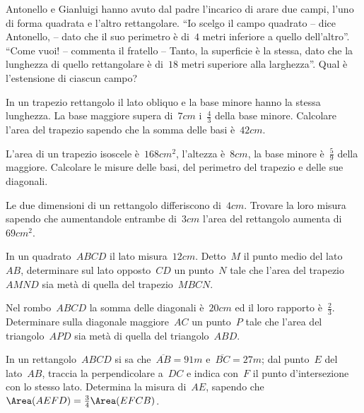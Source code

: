\begin{multicols}{2}
\begin{esercizio}[\Ast]
\label{ese:16.98}
Antonello e Gianluigi hanno avuto dal padre l'incarico di arare due campi, l'uno di forma quadrata e l'altro rettangolare. ``Io scelgo il campo quadrato -- dice Antonello, -- dato che il suo perimetro è di~$4$ metri inferiore a quello dell'altro''. ``Come vuoi! -- commenta il fratello -- Tanto, la superficie è la stessa, dato che la lunghezza di quello rettangolare è di~$18$ metri superiore alla larghezza''. Qual è l'estensione di ciascun campo?
\end{esercizio}

\begin{esercizio}[\Ast]
\label{ese:16.99}
In un trapezio rettangolo il lato obliquo e la base minore hanno la stessa lunghezza. La base maggiore supera di~$7\unit{cm}$ i~$\frac{4}{3}$ della base minore. Calcolare l'area del trapezio sapendo che la somma delle basi è~$42\unit{cm}$.
\end{esercizio}

\begin{esercizio}[\Ast]
\label{ese:16.100}
L'area di un trapezio isoscele è~$168\unit{cm^2}$, l'altezza è~$8\unit{cm}$, la base minore è~$\frac{5}{9}$ della maggiore. Calcolare le misure delle basi, del perimetro del trapezio e delle sue diagonali.
\end{esercizio}

\begin{esercizio}[\Ast]
\label{ese:16.101}
Le due dimensioni di un rettangolo differiscono di~$4\unit{cm}$. Trovare la loro misura sapendo che aumentandole entrambe di~$3\unit{cm}$ l'area del rettangolo aumenta di~$69\unit{cm^2}$.
\end{esercizio}

\begin{esercizio}[\Ast]
\label{ese:16.102}
In un quadrato~$ABCD$ il lato misura~$12\unit{cm}$. Detto~$M$ il punto medio del lato~$AB$, determinare sul lato opposto~$CD$ un punto~$N$ tale che l'area del trapezio~$AMND$ sia metà di quella del trapezio~$MBCN$.
\end{esercizio}

\begin{esercizio}[\Ast]
\label{ese:16.103}
Nel rombo~$ABCD$ la somma delle diagonali è~$20\unit{cm}$ ed il loro rapporto è~$\frac{2}{3}$. Determinare sulla diagonale maggiore~$AC$ un punto~$P$ tale che l'area del triangolo~$APD$ sia metà di quella del triangolo~$ABD$.
\end{esercizio}

\begin{esercizio}
\label{ese:16.104}
In un rettangolo~$ABCD$ si sa che~$\overline{AB}=91\unit{m}$ e~$\overline{BC}=27\unit{m}$; dal punto~$E$ del lato~$AB$, traccia la perpendicolare a~$DC$ e indica con~$F$ il punto d'intersezione con lo stesso lato. Determina la misura di~$AE$, sapendo che~$\Area(AEFD)=\frac{3}{4}\Area(EFCB)$.
\end{esercizio}
\end{multicols}
\pagebreak
